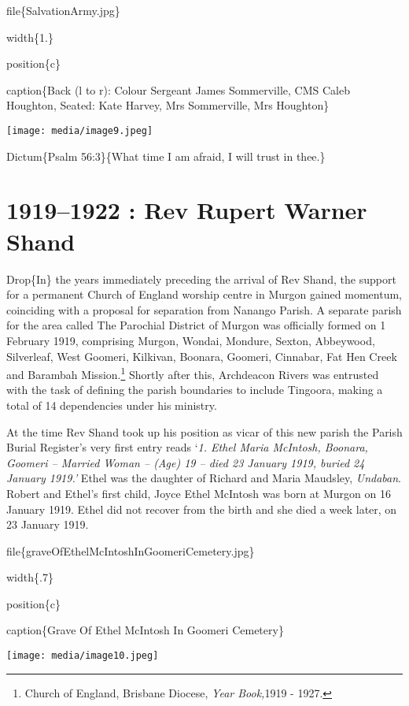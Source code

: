 file\{SalvationArmy.jpg\}

width\{1.\}

position\{c\}

caption\{Back (l to r): Colour Sergeant James Sommerville, CMS Caleb Houghton, Seated: Kate Harvey, Mrs Sommerville, Mrs Houghton\}

\texttt{[image: media/image9.jpeg]}

Dictum\{Psalm 56:3\}\{What time I am afraid, I will trust in thee.\}

\hypertarget{rev-rupert-warner-shand}{%
\chapter{1919--1922 : Rev Rupert Warner Shand}\label{rev-rupert-warner-shand}}

Drop\{In\} the years immediately preceding the arrival of Rev Shand, the support for a permanent Church of England worship centre in Murgon gained momentum, coinciding with a proposal for separation from Nanango Parish. A separate parish for the area called The Parochial District of Murgon was officially formed on 1 February 1919, comprising Murgon, Wondai, Mondure, Sexton, Abbeywood, Silverleaf, West Goomeri, Kilkivan, Boonara, Goomeri, Cinnabar, Fat Hen Creek and Barambah Mission.\footnote{Church of England, Brisbane Diocese, \emph{Year Book,}1919 - 1927.} Shortly after this, Archdeacon Rivers was entrusted with the task of defining the parish boundaries to include Tingoora, making a total of 14 dependencies under his ministry.

At the time Rev Shand took up his position as vicar of this new parish the Parish Burial Register's very first entry reads `\emph{1. Ethel Maria McIntosh, Boonara, Goomeri -- Married Woman -- (Age) 19 -- died 23 January 1919, buried 24 January 1919.'} Ethel was the daughter of Richard and Maria Maudsley, \emph{Undaban}. Robert and Ethel's first child, Joyce Ethel McIntosh was born at Murgon on 16 January 1919. Ethel did not recover from the birth and she died a week later, on 23 January 1919.

file\{graveOfEthelMcIntoshInGoomeriCemetery.jpg\}

width\{.7\}

position\{c\}

caption\{Grave Of Ethel McIntosh In Goomeri Cemetery\}

\texttt{[image: media/image10.jpeg]}

